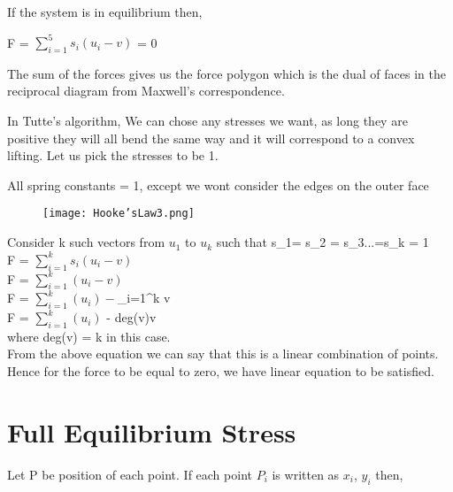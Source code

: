 \documentclass{article}
\begin{document}
    \newline If the system is in equilibrium then,
    
    \newline F = $\sum_{i=1}^{5} s_i(u_i-v)$ = 0
    
    The sum of the forces gives us the force polygon which is the dual of faces in the reciprocal diagram from Maxwell's correspondence.
    
    \newline In Tutte's algorithm,
    \newline We can chose any stresses we want, as long they are positive they will all bend the same way and it will correspond to a convex lifting. Let us pick the stresses to be 1. 
    
    \newline All spring constants = 1, except we wont consider the edges on the outer face
    
    \begin{figure}[H]
            \centering
            \texttt{[image: Hooke'sLaw3.png]}
    \end{figure}
    
    Consider k such vectors from $u_1$ to $u_k$ such that s_1= s_2 = s_3...=s_k = 1 \\
    \newline F = $\sum_{i=1}^{k} s_i(u_i-v)$ \\
    \newline F = $\sum_{i=1}^{k} (u_i-v)$ \\
    \newline F = $\sum_{i=1}^{k} (u_i) - $\sum_{i=1}^{k} v  \\
    \newline F = $\sum_{i=1}^{k} (u_i)$ - deg(v)v  \\
    
    where deg(v) = k in this case. \\
    
    From the above equation we can say that this is a linear combination of points.\\
    Hence for the force to be equal to zero, we have linear equation to be satisfied.\\
    
    \section{Full Equilibrium Stress}
    Let P be position of each point. If each point $P_i$ is written as $x_i$, $y_i$ then,
    
\end{document}
